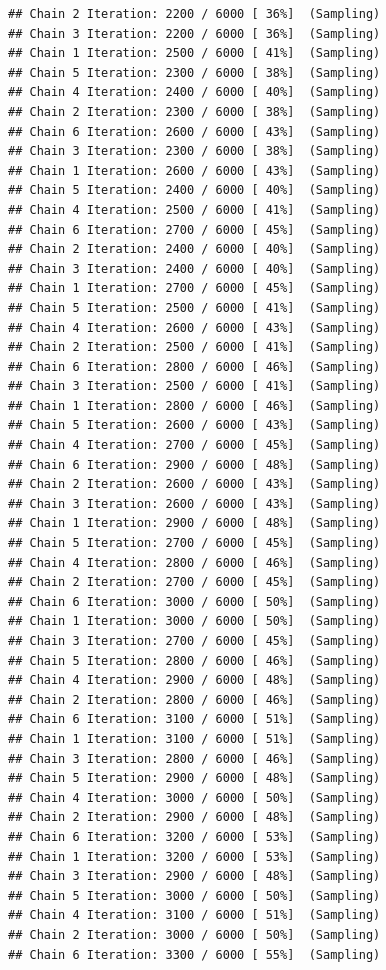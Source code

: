 \documentclass[
]{article}
\begin{document}
\begin{verbatim}
## Chain 2 Iteration: 2200 / 6000 [ 36%]  (Sampling) 
## Chain 3 Iteration: 2200 / 6000 [ 36%]  (Sampling) 
## Chain 1 Iteration: 2500 / 6000 [ 41%]  (Sampling) 
## Chain 5 Iteration: 2300 / 6000 [ 38%]  (Sampling) 
## Chain 4 Iteration: 2400 / 6000 [ 40%]  (Sampling) 
## Chain 2 Iteration: 2300 / 6000 [ 38%]  (Sampling) 
## Chain 6 Iteration: 2600 / 6000 [ 43%]  (Sampling) 
## Chain 3 Iteration: 2300 / 6000 [ 38%]  (Sampling) 
## Chain 1 Iteration: 2600 / 6000 [ 43%]  (Sampling) 
## Chain 5 Iteration: 2400 / 6000 [ 40%]  (Sampling) 
## Chain 4 Iteration: 2500 / 6000 [ 41%]  (Sampling) 
## Chain 6 Iteration: 2700 / 6000 [ 45%]  (Sampling) 
## Chain 2 Iteration: 2400 / 6000 [ 40%]  (Sampling) 
## Chain 3 Iteration: 2400 / 6000 [ 40%]  (Sampling) 
## Chain 1 Iteration: 2700 / 6000 [ 45%]  (Sampling) 
## Chain 5 Iteration: 2500 / 6000 [ 41%]  (Sampling) 
## Chain 4 Iteration: 2600 / 6000 [ 43%]  (Sampling) 
## Chain 2 Iteration: 2500 / 6000 [ 41%]  (Sampling) 
## Chain 6 Iteration: 2800 / 6000 [ 46%]  (Sampling) 
## Chain 3 Iteration: 2500 / 6000 [ 41%]  (Sampling) 
## Chain 1 Iteration: 2800 / 6000 [ 46%]  (Sampling) 
## Chain 5 Iteration: 2600 / 6000 [ 43%]  (Sampling) 
## Chain 4 Iteration: 2700 / 6000 [ 45%]  (Sampling) 
## Chain 6 Iteration: 2900 / 6000 [ 48%]  (Sampling) 
## Chain 2 Iteration: 2600 / 6000 [ 43%]  (Sampling) 
## Chain 3 Iteration: 2600 / 6000 [ 43%]  (Sampling) 
## Chain 1 Iteration: 2900 / 6000 [ 48%]  (Sampling) 
## Chain 5 Iteration: 2700 / 6000 [ 45%]  (Sampling) 
## Chain 4 Iteration: 2800 / 6000 [ 46%]  (Sampling) 
## Chain 2 Iteration: 2700 / 6000 [ 45%]  (Sampling) 
## Chain 6 Iteration: 3000 / 6000 [ 50%]  (Sampling) 
## Chain 1 Iteration: 3000 / 6000 [ 50%]  (Sampling) 
## Chain 3 Iteration: 2700 / 6000 [ 45%]  (Sampling) 
## Chain 5 Iteration: 2800 / 6000 [ 46%]  (Sampling) 
## Chain 4 Iteration: 2900 / 6000 [ 48%]  (Sampling) 
## Chain 2 Iteration: 2800 / 6000 [ 46%]  (Sampling) 
## Chain 6 Iteration: 3100 / 6000 [ 51%]  (Sampling) 
## Chain 1 Iteration: 3100 / 6000 [ 51%]  (Sampling) 
## Chain 3 Iteration: 2800 / 6000 [ 46%]  (Sampling) 
## Chain 5 Iteration: 2900 / 6000 [ 48%]  (Sampling) 
## Chain 4 Iteration: 3000 / 6000 [ 50%]  (Sampling) 
## Chain 2 Iteration: 2900 / 6000 [ 48%]  (Sampling) 
## Chain 6 Iteration: 3200 / 6000 [ 53%]  (Sampling) 
## Chain 1 Iteration: 3200 / 6000 [ 53%]  (Sampling) 
## Chain 3 Iteration: 2900 / 6000 [ 48%]  (Sampling) 
## Chain 5 Iteration: 3000 / 6000 [ 50%]  (Sampling) 
## Chain 4 Iteration: 3100 / 6000 [ 51%]  (Sampling) 
## Chain 2 Iteration: 3000 / 6000 [ 50%]  (Sampling) 
## Chain 6 Iteration: 3300 / 6000 [ 55%]  (Sampling) 

\end{verbatim}
\end{document}
